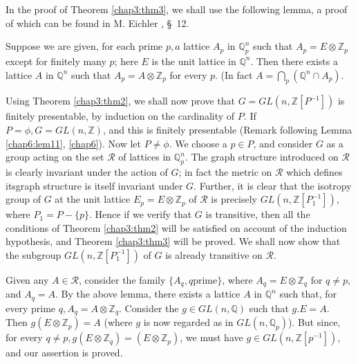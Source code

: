 {{In the proof of Theorem \ref{chap3:thm3}, we shall use the following
lemma, a proof of which can be found in M. Eichler \cite{key1}, \S\ 12.  


\begin{lemma*}
  Suppose we are given, for each prime $p,a$ lattice $A_p$ in
  $\mathbb{Q}^n_p$ such that $A_p = E \otimes \mathbb{Z}_p$ except for
  finitely many $p$; here $E$ is the unit lattice in
  $\mathbb{Q}^n$. Then there exists a lattice $A$ in $\mathbb{Q}^n$ such
  that $A_p = A \otimes \mathbb{Z}_p$ for every $p$. (In fact $A =
  \bigcap \limits_p (\mathbb{Q}^n \cap A_p)$. 
\end{lemma*}

\setcounter{proofofThm}{2}
\begin{proofofThm}%
  Using Theorem \ref{chap3:thm2}, we shall now prove that $G = GL(n,
  \mathbb{Z}[P^{-1}])$ is finitely presentable, by induction on the
  cardinality of $P$. If $P = \phi , G = GL (n, \mathbb{Z})$, and this
  is finitely presentable (Remark following Lemma \ref{chap6:lem11},
  \ref{chap6}). Now 
  let $P \neq \phi$. We choose a $p \in P$, and consider $G$ as a group
  acting on the set $\mathcal{R}$ of lattices in $\mathbb{Q}^n_p$. The
  graph structure introduced on $\mathcal{R}$ is clearly invariant under
  the action of $G$; in fact the metric on $\mathcal{R}$ which defines
  its\pageoriginale graph structure is itself invariant under $G$. Further, it is
  clear that the isotropy group of $G$ at the unit lattice $E_p = E
  \otimes \mathbb{Z}_p$ of $\mathcal{R}$  is precisely $GL(n,
  \mathbb{Z}[P^{-1}_1])$, where $P_1 = P- \{p \}$. Hence if we verify
  that $G$ is transitive, then all the conditions of Theorem
  \ref{chap3:thm2} will be 
  satisfied on account of the induction hypothesis, and Theorem
  \ref{chap3:thm3} will 
  be proved. We shall now show that the subgroup $GL(n,
  \mathbb{Z}[P^{-1}_1])$ of $G$ is already transitive on $\mathcal{R}$. 
\end{proofofThm}

Given any $A \in \mathcal{R}$, consider the family $\{A_q,q \text{
  prime} \}$, where $A_q = E \otimes \mathbb{Z}_q$ for $q \neq p$, and
$A_{q} = A$. By the above lemma, there exists a lattice $A$ in
$\mathbb{Q}^n$ such that, for every prime $q,A_q = A \otimes
\mathbb{Z}_q$. Consider the $g \in GL(n, \mathbb{Q})$ such that
$g.E=A$. Then $g(E \otimes \mathbb{Z}_p)=A$ (where $g$ is now regarded 
as in $GL(n, \mathbb{Q}_p)$). But since, for every $q \neq p, g(E
\otimes \mathbb{Z}_q) = (E \otimes \mathbb{Z}_p)$, we must have $g \in
GL(n, \mathbb{Z}[p^{-1}])$, and our assertion is proved. 

}}
